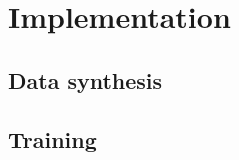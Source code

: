 \documentclass[../main.tex]{subfiles}
\begin{document}
\chapter{Implementation}

\section{Data synthesis}
\section{Training}
\end{document}
